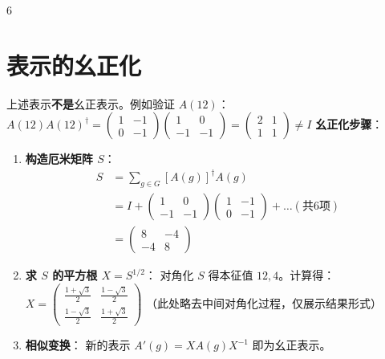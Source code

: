 \documentclass[landscape]{article}
\begin{document}
\begin{multicols*}{6}
\section*{表示的幺正化}
上述表示\textbf{不是}幺正表示。例如验证 $A(12)$：
\\ $ A(12) A(12)^\dagger = \begin{pmatrix} 1 & -1 \\ 0 & -1 \end{pmatrix} \begin{pmatrix} 1 & 0 \\ -1 & -1 \end{pmatrix} = \begin{pmatrix} 2 & 1 \\ 1 & 1 \end{pmatrix} \neq I $
\textbf{幺正化步骤}：
\begin{enumerate}
    \item \textbf{构造厄米矩阵 $S$}：
    \begin{align*}
    S &= \sum_{g \in G} [A(g)]^\dagger A(g) \\
      &= I + \begin{pmatrix} 1 & 0 \\ -1 & -1 \end{pmatrix}\begin{pmatrix} 1 & -1 \\ 0 & -1 \end{pmatrix} + \dots (\text{共6项}) \\
      &= \begin{pmatrix} 8 & -4 \\ -4 & 8 \end{pmatrix}
    \end{align*}
    \item \textbf{求 $S$ 的平方根 $X = S^{1/2}$}：
    对角化 $S$ 得本征值 $12, 4$。计算得：
    \\ $ X = \begin{pmatrix} \frac{1+\sqrt{3}}{2} & \frac{1-\sqrt{3}}{2} \\ \frac{1-\sqrt{3}}{2} & \frac{1+\sqrt{3}}{2} \end{pmatrix} $
    （此处略去中间对角化过程，仅展示结果形式）
    \item \textbf{相似变换}：
    新的表示 $A'(g) = X A(g) X^{-1}$ 即为幺正表示。
\end{enumerate}

\end{multicols*}
\end{document}
